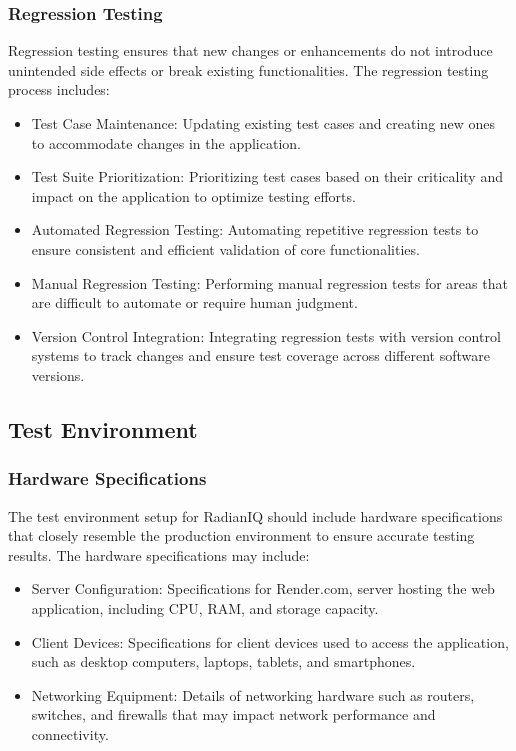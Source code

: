 		\subsubsection{Regression Testing}
		
		Regression testing ensures that new changes or enhancements do not introduce unintended side effects or break existing functionalities. The regression testing process includes:
		
		\begin{itemize}
			\item Test Case Maintenance: Updating existing test cases and creating new ones to accommodate changes in the application.
			\item Test Suite Prioritization: Prioritizing test cases based on their criticality and impact on the application to optimize testing efforts.
			\item Automated Regression Testing: Automating repetitive regression tests to ensure consistent and efficient validation of core functionalities.
			\item Manual Regression Testing: Performing manual regression tests for areas that are difficult to automate or require human judgment.
			\item Version Control Integration: Integrating regression tests with version control systems to track changes and ensure test coverage across different software versions.
		\end{itemize}
		
	
	\subsection{Test Environment}
	
		\subsubsection{Hardware Specifications}
		
		The test environment setup for RadianIQ should include hardware specifications that closely resemble the production environment to ensure accurate testing results. The hardware specifications may include:
		
		\begin{itemize}
			\item Server Configuration: Specifications for Render.com, server hosting the web application, including CPU, RAM, and storage capacity.
			\item Client Devices: Specifications for client devices used to access the application, such as desktop computers, laptops, tablets, and smartphones.
			\item Networking Equipment: Details of networking hardware such as routers, switches, and firewalls that may impact network performance and connectivity.
		\end{itemize}
		
